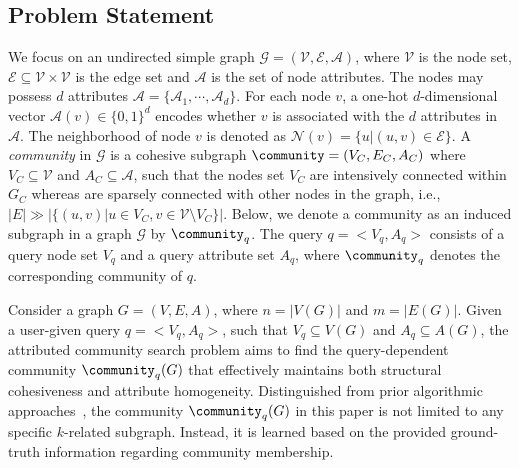 
\subsection{Problem Statement}
We focus on an undirected simple graph ${\mathcal G} = (\mathcal V, \mathcal E, \mathcal A)$, where $\mathcal{V}$ is the node set, $\mathcal{E} \subseteq \mathcal V \times \mathcal V$ is the edge set and $\mathcal{A}$ is the set of node attributes. 
The nodes may possess $d$ attributes $\mathcal{A} = \{ \mathcal{A}_1, \cdots, \mathcal{A}_d\}$. For each node $v$, a one-hot $d$-dimensional vector $\mathcal{A}(v) \in \{0,
1\}^d$ encodes whether $v$ is associated with the $d$ attributes in
$\mathcal{A}$. 
The neighborhood of node $v$ is denoted as $\mathcal{N}(v) = \{ u |
(u, v) \in \mathcal{E} \}$.  
A \emph{community} in ${\mathcal G}$ is a cohesive subgraph $\community = (V_C, E_C, A_C)$ where $V_C \subseteq \mathcal{V}$ and $A_C \subseteq \mathcal{A}$, such that the nodes set $V_C$ are intensively connected within $G_C$ whereas are sparsely connected with other nodes in the graph, i.e., $|E| \gg |\{ (u, v) | u \in V_C, v \in \mathcal{V} \setminus V_C \}|$. Below, we denote a community as an induced subgraph in a graph $\mathcal G$ by $\community_q$. The query $q=<V_q,A_q>$ consists of a query node set $V_q$ and a query attribute set $A_q$, where $\community_q$ denotes the corresponding community of $q$.

 Consider a graph $G=(V, E, A)$, where $n = |V(G)|$ and $m = |E(G)|$. Given a user-given query $q =<V_q, A_q>$, such that $V_q \subseteq V(G)$ and $A_q \subseteq A(G)$, the attributed community search problem aims to find the query-dependent community $\community_q(G)$ that effectively maintains both structural cohesiveness and attribute homogeneity.
Distinguished from prior algorithmic approaches~\cite{ATC, ACQ, CTC}, the community $\community_q(G)$ in this paper is not limited to any specific $k$-related subgraph. Instead, it is learned based on the provided ground-truth information regarding community membership.

